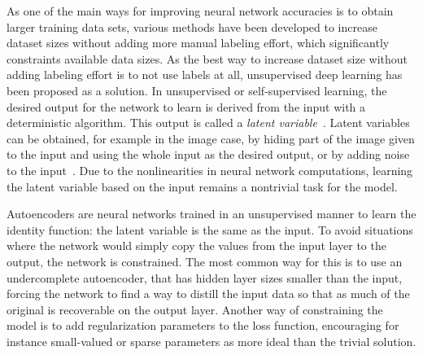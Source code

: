 \documentclass[english,twoside,openright]{UH_DS_MSc}
\begin{document}
As one of the main ways for improving neural network accuracies is to obtain larger training data 
sets, various methods have been developed to increase dataset sizes without adding more manual labeling 
effort, which significantly constraints available data sizes. As the best way to increase dataset 
size without adding labeling effort is to not use labels at all, unsupervised deep learning has been proposed 
as a solution. In unsupervised or self-supervised learning, the desired output for the network to learn is 
derived from the input with a deterministic algorithm. This output is called a \textit{latent variable}~\cite{goodfellow}.
Latent variables can be obtained, for example in the image case, by hiding part of the image given to the input 
and using the whole input as the desired output, or by adding noise to the input~\cite{princebook}.
Due to the nonlinearities in neural network computations, learning the latent variable 
based on the input remains a nontrivial task for the model.

Autoencoders are neural networks trained in an unsupervised manner to learn the identity function: the latent 
variable is the same as the input. To avoid situations where the network would simply copy the values from 
the input layer to the output, the network is constrained. The most common way for this is to use an undercomplete
autoencoder, that has hidden layer sizes smaller than the input, forcing the network to find a way to distill 
the input data so that as much of the original is recoverable on the output layer.
Another way of constraining the model is to add regularization parameters to the 
loss function, encouraging for instance small-valued or sparse parameters as more 
ideal than the trivial solution.
		
\end{document}

